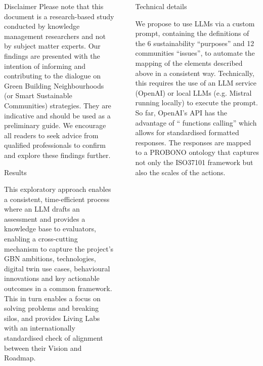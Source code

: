 \documentclass[final]{beamer}
\newlength{\sepwid}
\newlength{\onecolwid}
\begin{document}
\begin{columns}[t]
\begin{column}{\onecolwid}
\begin{block}{Disclaimer}
Please note that this document is a research-based study conducted by knowledge management researchers and not by subject matter experts. Our findings are presented with the intention of informing and contributing to the dialogue on Green Building Neighbourhoods (or Smart Sustainable Communities) strategies. They are indicative and should be used as a preliminary guide. We encourage all readers to seek advice from qualified professionals to confirm and explore these findings further.

          \end{block}
        
          
          
          \begin{block}{Results}

This exploratory approach enables a consistent, time-efficient process where an LLM drafts an assessment and provides a knowledge base to evaluators, enabling a cross-cutting mechanism to capture the project’s GBN ambitions, technologies, digital twin use cases, behavioural innovations and key actionable outcomes in a common framework. This in turn enables a focus on solving problems and breaking silos, and provides Living Labs with an internationally standardised check of alignment between their Vision and Roadmap.



          \end{block}
         
         \end{column}
                  
                  
         \begin{column}{\sepwid}  \end{column}
         
         
         
         
         \begin{column}{\onecolwid} %
\vspace{4.5cm}
         \begin{block}{Technical details}
         
We propose to use LLMs via a custom prompt, containing the definitions of the  6 sustainability “purposes” and 12 communities “issues”, to automate the mapping of the elements described above in a consistent way. Technically, this requires the use of an LLM service (OpenAI) or local LLMs (e.g. Mistral running locally) to execute the prompt. So far, OpenAI’s API has the advantage of “ functions calling” which allows for standardised formatted responses. The responses are mapped to a PROBONO ontology that captures not only the ISO37101 framework but also the scales of the actions.


\end{block}
\end{column}
\end{columns}
\end{document}
